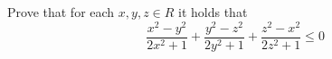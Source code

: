 Prove that for each $x,y,z \in R$ it holds that
$$\frac{x^2-y^2}{2x^2+1} +\frac{y^2-z^2}{2y^2+1}+\frac{z^2-x^2}{2z^2+1}\le 0$$
